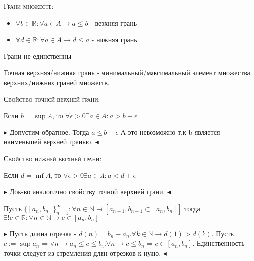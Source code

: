 \documentclass[14pt]{extreport}
\begin{document}
        \textsc{Грани множеств:}

        \begin{itemize}
            \item $\forall b \in \mathbb{R}:\forall a \in A \rightarrow a \leq b$ - верхняя грань 
            \item $\forall d \in \mathbb{R}:\forall a \in A \rightarrow d \leq a$ - нижняя грань 
        \end{itemize}

            Грани не единственны

        \begin{definition}
            Точная верхняя/нижняя грань - минимальный/максимальный элемент множества верхних/нижних граней множеств. 
        \end{definition}


        \textsc{Свойство точной верхней грани:}

        Если $ b = \sup A$, то $\forall \epsilon > 0 \exists a \in A: a > b - \epsilon$

        $\blacktriangleright$
            Допустим обратное. Тогда $a \leq b - \epsilon$ А это невозможно т.к b является наименьшей верхней гранью.
        $\blacktriangleleft$
    
        \textsc{Свойство нижней верхней грани:}

        Если $ d = \inf A$, то $\forall \epsilon > 0 \exists a \in A: a < d + \epsilon$

        $\blacktriangleright$
            Док-во аналогично свойству точной верхней грани. 
        $\blacktriangleleft$

        \begin{theorem}
            Пусть $\{[a_n, b_n]\}^{\infty}_{n=1}: \forall n \in \mathbb{N} \rightarrow [a_{n+1}, b_{n+1} \subset [a_n, b_n]]$ тогда $\exists ! c \in \mathbb{R}: \forall n \in \mathbb{N} \rightarrow c \in [a_n, b_n]$
        \end{theorem}
        $\blacktriangleright$
            Пусть длина отрезка - $d(n) = b_n - a_n. \forall k \in \mathbb{N} \rightarrow d(1) > d(k)$. Пусть $c := \sup a_n \Rightarrow \forall n \rightarrow a_n \leq c \leq b_n. \forall n \rightarrow c \leq b_n \Rightarrow c \in [a_n, b_n]$. Единственность точки следует из стремления длин отрезков к нулю.
        $\blacktriangleleft$
\end{document}
